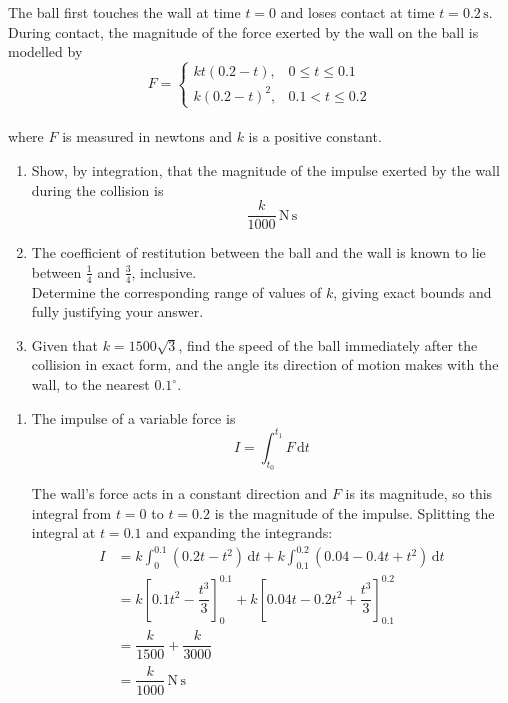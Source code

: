 \documentclass[leqno]{article}
\begin{document}
\begin{enumerate}[
  label=\textbf{\arabic*.},
  leftmargin=*,
  topsep=0pt,
  partopsep=0pt,
  parsep=0pt
]
The ball first touches the wall at time $t=0$ and loses contact at time $t=0.2\,\mathrm{s}$. \\
During contact, the magnitude of the force exerted by the wall on the ball is modelled by
\[
F=\begin{cases}
kt(0.2-t), & 0\leq t\leq 0.1\\
k(0.2-t)^2, & 0.1<t\leq 0.2
\end{cases}
\] \\
where $F$ is measured in newtons and $k$ is a positive constant. \\
\begin{enumerate}[label=\textbf{(\alph*)}]
\item Show, by integration, that the magnitude of the impulse exerted by the wall during the collision is
\[
\frac{k}{1000}\,\mathrm{N\,s}
\] 
\item The coefficient of restitution between the ball and the wall is known to lie between $\frac{1}{4}$ and $\frac{3}{4}$, inclusive. \\
Determine the corresponding range of values of $k$, giving exact bounds and fully justifying your answer.  \\
\item Given that $k=1500\sqrt{3}$, find the speed of the ball immediately after the collision in exact form, and the angle its direction of motion makes with the wall, to the nearest $0.1^\circ$.  \\
\end{enumerate}

\vspace*{10pt}

\begin{djsSolution}
\begin{enumerate}[label=\textbf{(\alph*)}, start=1]
\item The impulse of a variable force is
\[
I=\int_{t_0}^{t_1}F\,\mathrm{d}t
\]

The wall's force acts in a constant direction and \(F\) is its magnitude, so this integral from \(t=0\) to \(t=0.2\) is the magnitude of the impulse. Splitting the integral at \(t=0.1\) and expanding the integrands:
\begin{align*}
I&=k\int_{0}^{0.1}(0.2t-t^2)\,\mathrm{d}t
+k\int_{0.1}^{0.2}(0.04-0.4t+t^2)\,\mathrm{d}t\\
&=k\left[0.1t^2-\dfrac{t^3}{3}\right]_{0}^{0.1}
+k\left[0.04t-0.2t^2+\dfrac{t^3}{3}\right]_{0.1}^{0.2}\\
&=\dfrac{k}{1500}+\dfrac{k}{3000}\\
&=\dfrac{k}{1000}\,\mathrm{N\,s}
\end{align*}


\end{enumerate}
\end{djsSolution}
\end{enumerate}
\end{document}
